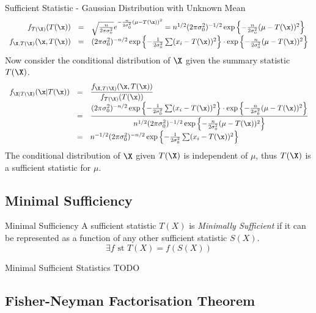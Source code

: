 \documentclass[11pt,a4paper]{article}
\begin{document}
\begin{example}{Sufficient Statistic - Gaussian Distribution with Unknown Mean}
\[\begin{array}{rcl}
      f_{T(\X)}(T(\x))&=&\sqrt{\frac{n}{2\pi\sigma_0^2}}e^{-\frac{n}{2\sigma_0^2}(\mu-T(\x))^2}=n^{1/2}(2\pi\sigma_0^2)^{-1/2}\exp\left\{-\frac{n}{2\sigma_0^2}(\mu-T(\x))^2\right\}\\
      f_{\X,T(\X)}(\x,T(\x))&=&(2\pi\sigma_0^2)^{-n/2}\exp\left\{-\frac1{2\sigma_0^2}\sum(x_i-T(\x))^2\right\}\cdot\exp\left\{-\frac{n}{2\sigma_0^2}(\mu-T(\x))^2\right\}\\
    \end{array}\]
    Now consider the conditional distribution of $\X$ given the summary statistic $T(\X)$.
    \[\begin{array}{rcl}
      f_{\X|T(\X)}(\x|T(\x))&=&\dfrac{f_{\X,T(\X)}(\x,T(\x))}{f_{T(\X)}(T(\x))}\\
      &=&\dfrac{(2\pi\sigma_0^2)^{-n/2}\exp\left\{-\frac1{2\sigma_0^2}\sum(x_i-T(\x))^2\right\}\cdot\exp\left\{-\frac{n}{2\sigma_0^2}(\mu-T(\x))^2\right\}}{n^{1/2}(2\pi\sigma_0^2)^{-1/2}\exp\left\{-\frac{n}{2\sigma_0^2}(\mu-T(\x))^2\right\}}\\
      &=&n^{-1/2}(2\pi\sigma_0^2)^{-n/2}\exp\left\{-\frac1{2\sigma_0^2}\sum(x_i-T(\x))^2\right\}
    \end{array}\]
    The conditional distribution of $\X$ given $T(\X)$ is independent of $\mu$, thus $T(\X)$ is a sufficient statistic for $\mu$.
  \end{example}

\subsection*{Minimal Sufficiency}

  \begin{definition}{Minimal Sufficiency}
    A sufficient statistic $T(X)$ is \textit{Minimally Sufficient} if it can be represented as a function of any other sufficient statistic $S(X)$.
    \[ \exists f\text{ st }T(X)=f(S(X)) \]
  \end{definition}

  \begin{example}{Minimal Sufficient Statistics}
    TODO
  \end{example}

\subsection*{Fisher-Neyman Factorisation Theorem}
\end{document}
